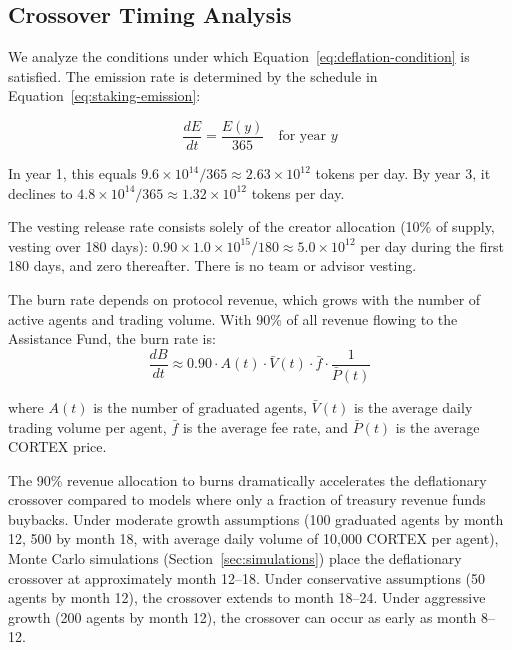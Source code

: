 \subsection{Crossover Timing Analysis}
\label{subsec:crossover-timing}

We analyze the conditions under which Equation~\eqref{eq:deflation-condition}
is satisfied. The emission rate is determined by the schedule in
Equation~\eqref{eq:staking-emission}:

\begin{equation}
  \frac{dE}{dt} = \frac{E(y)}{365} \quad \text{for year } y
  \label{eq:emission-rate}
\end{equation}

In year 1, this equals $9.6 \times 10^{14} / 365 \approx 2.63 \times 10^{12}$
tokens per day. By year 3, it declines to $4.8 \times 10^{14} / 365 \approx
1.32 \times 10^{12}$ tokens per day.

The vesting release rate consists solely of the creator allocation (10\% of
supply, vesting over 180 days): $0.90 \times 1.0 \times 10^{15} / 180 \approx
5.0 \times 10^{12}$ per day during the first 180 days, and zero thereafter.
There is no team or advisor vesting.

The burn rate depends on protocol revenue, which grows with the number of
active agents and trading volume. With 90\% of all revenue flowing to the
Assistance Fund, the burn rate is:
\begin{equation}
  \frac{dB}{dt} \approx 0.90 \cdot A(t) \cdot \bar{V}(t) \cdot \bar{f} \cdot \frac{1}{\bar{P}(t)}
  \label{eq:burn-rate-approx}
\end{equation}

where $A(t)$ is the number of graduated agents, $\bar{V}(t)$ is the average
daily trading volume per agent, $\bar{f}$ is the average fee rate, and
$\bar{P}(t)$ is the average CORTEX price.

\begin{remark}
The 90\% revenue allocation to burns dramatically accelerates the deflationary
crossover compared to models where only a fraction of treasury revenue funds
buybacks. Under moderate growth assumptions (100 graduated agents by month 12,
500 by month 18, with average daily volume of 10{,}000 CORTEX per agent),
Monte Carlo simulations (Section~\ref{sec:simulations}) place the deflationary
crossover at approximately month 12--18. Under conservative assumptions
(50 agents by month 12), the crossover extends to month 18--24. Under
aggressive growth (200 agents by month 12), the crossover can occur as early
as month 8--12.
\end{remark}

